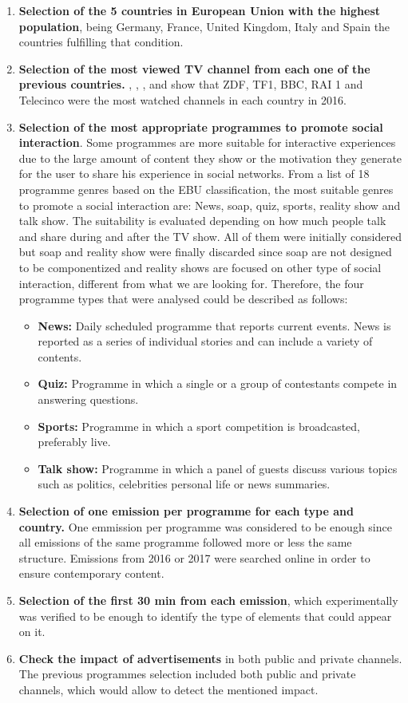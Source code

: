 \begin{enumerate}
	\item \textbf{Selection of the 5 countries in European Union with the highest population}, being Germany, France, United Kingdom, Italy and Spain the countries fulfilling that condition. 
	\item \textbf{Selection of the most viewed TV channel from each one of the previous countries.} \cite{staGermany}, \cite{staFrance}, \cite{staUk}, \cite{staItaly} and \cite{staSpain} show that ZDF, TF1, BBC, RAI 1 and Telecinco were the most watched channels in each country in 2016. 
	\item \textbf{Selection of the most appropriate programmes to promote social interaction}. Some programmes are more suitable for interactive experiences \cite{geerts2008implications} due to the large amount of content they show or the motivation they generate for the user to share his experience in social networks. From a list of 18 programme genres based on the EBU \cite{ebu} classification, the most suitable genres to promote a social interaction are: News, soap, quiz, sports, reality show and talk show. The suitability is evaluated depending on how much people talk and share during and after the TV show. All of them were initially considered but soap and reality show were finally discarded since soap are not designed to be componentized and reality shows are focused on other type of social interaction, different from what we are looking for. Therefore, the four programme types that were analysed could be described as follows:
	\begin{itemize}
		\item \textbf{News:} Daily scheduled programme that reports current events. News is reported as a series of individual stories and can include a variety of contents. 
		\item \textbf{Quiz:} Programme in which a single or a group of contestants compete in answering questions.
		\item \textbf{Sports:} Programme in which a sport competition is broadcasted, preferably live.
		\item \textbf{Talk show:} Programme in which a panel of guests discuss various topics such as politics, celebrities personal life or news summaries. 
	\end{itemize}
	\item \textbf{Selection of one emission per programme for each type and country.} One emmission per programme was considered to be enough since all emissions of the same programme followed more or less the same structure. Emissions from 2016 or 2017 were searched online in order to ensure contemporary content. 
	\item \textbf{Selection of the first 30 min from each emission}, which experimentally was verified to be enough to identify the type of elements that could appear on it.
	\item \textbf{Check the impact of advertisements} in both public and private channels. The previous programmes selection included both public and private channels, which would allow to detect the mentioned impact.    
\end{enumerate} 

